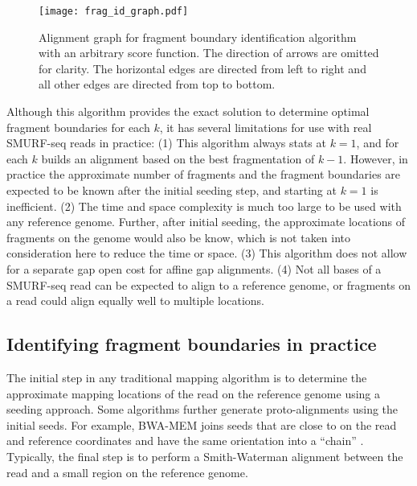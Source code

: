 \begin{figure}[h!]
\centering
\texttt{[image: frag\_id\_graph.pdf]}
\caption[Alignment graph for fragment boundary identification algorithm
  with an arbitrary score function]{
  Alignment graph for fragment boundary identification algorithm
  with an arbitrary score function. The direction of arrows are omitted
  for clarity. The horizontal edges are directed from left to right and
  all other edges are directed from top to bottom.}
\label{frag_alg}
\end{figure}

Although this algorithm provides the exact solution to determine optimal
fragment boundaries for each $k$, it has several limitations for use
with real SMURF-seq reads in practice:
(1) This algorithm always stats at $k=1$, and for each $k$ builds an
alignment based on the best fragmentation of $k-1$.
However, in practice the approximate number of fragments and the
fragment boundaries are expected to be known after the initial seeding
step, and starting at $k=1$ is inefficient.
(2) The time and space complexity is much too large to be used
with any reference genome. Further, after initial seeding, the
approximate locations of fragments on the genome would also be know,
which is not taken into consideration here to reduce the time or space.
(3) This algorithm does not allow for a separate gap open
cost for affine gap alignments.
(4) Not all bases of a SMURF-seq read can be expected to align to a
reference genome, or fragments on a read could align equally well to
multiple locations.

\subsection{Identifying fragment boundaries in practice}
The initial step in any traditional mapping algorithm is to determine the
approximate mapping locations of the read on the reference genome using
a seeding approach.
%
Some algorithms further generate proto-alignments using the initial
seeds.
For example, BWA-MEM joins seeds that are close to on the read and
reference coordinates and have the same orientation into a ``chain''
\citep{li2013aligning}.
%
Typically, the final step is to perform a Smith-Waterman alignment
between the read and a small region on the reference genome.

